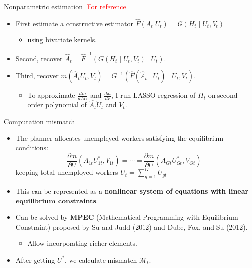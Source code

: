 \documentclass[aspectratio=169]{beamer}
\begin{document}
\begin{frame}{Nonparametric estimation \textcolor{red}{[For reference]}}
    \begin{itemize}
    \item First estimate a constructive estimator $\hat{F}(A_t|U_t)=G\left(H_t \mid U_t, V_t\right)$ 
    \begin{itemize}
        \item using bivariate kernels.
    \end{itemize}
    \item Second, recover $\hat{A}_t=\hat{F}^{-1}\left(G\left(H_t \mid U_t, V_t\right) \mid U_t\right)$.
    \item Third, recover $m\left(\hat{A}_t U_t, V_t\right)=G^{-1}\left(\hat{F}\left(\hat{A}_t \mid U_t\right) \mid U_t, V_t\right)$.
    \begin{itemize}
        \item To approximate $\frac{d m}{d AU}$ and $\frac{d m}{d V}$, I run LASSO regression of $H_{t}$ on second order polynomial of $\hat{A_{t}}U_{t}$ and $V_{t}$.
    \end{itemize}
    
    
    \end{itemize}
\end{frame}

\begin{frame}{Computation mismatch}
    \begin{itemize}
    \item The planner allocates unemployed workers satisfying the equilibrium conditions:
    $$
    \frac{\partial m}{\partial U}\left(A_{1 t} U_{1 t}^*, V_{1 t}\right)=\cdots=\frac{\partial m}{\partial U}\left(A_{G t} U_{G t}^*, V_{G t}\right)
    $$
    keeping total unemployed workers $U_t=\sum_{g=1}^G U_{g t}$
    \item This can be represented as a \textbf{nonlinear system of equations with linear equilibrium constraints}.
    \item Can be solved by \textbf{MPEC} (Mathematical Programming with Equilibrium Constraint) proposed by Su and Judd (2012) and Dube, Fox, and Su (2012).
    \begin{itemize}
        \item Allow incorporating richer elements.
    \end{itemize}
    \item After getting $U^*$, we calculate mismatch $\mathcal{M}_t$.
    \end{itemize}
\end{frame}
\end{document}
